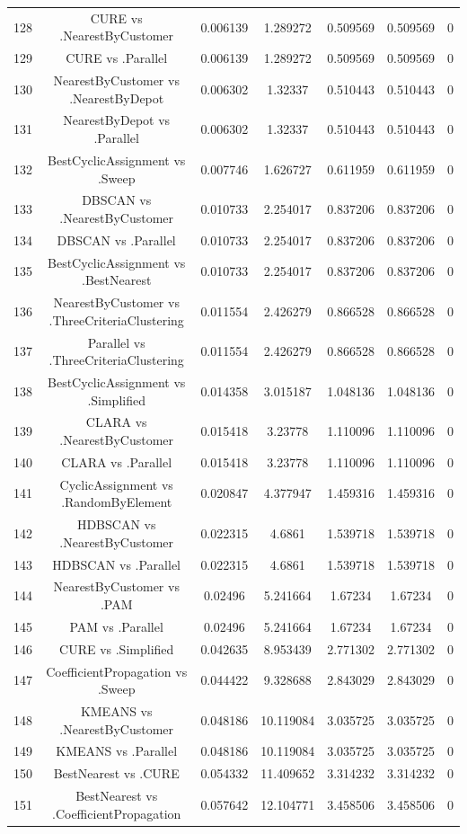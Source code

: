 \documentclass[a4paper,10pt]{article}
\begin{document}
\begin{landscape}
\begin{table}[!htp]
\begin{tabular}{ccccccc}
128&CURE vs .NearestByCustomer&0.006139&1.289272&0.509569&0.509569&0\\
129&CURE vs .Parallel&0.006139&1.289272&0.509569&0.509569&0\\
130&NearestByCustomer vs .NearestByDepot&0.006302&1.32337&0.510443&0.510443&0\\
131&NearestByDepot vs .Parallel&0.006302&1.32337&0.510443&0.510443&0\\
132&BestCyclicAssignment vs .Sweep&0.007746&1.626727&0.611959&0.611959&0\\
133&DBSCAN vs .NearestByCustomer&0.010733&2.254017&0.837206&0.837206&0\\
134&DBSCAN vs .Parallel&0.010733&2.254017&0.837206&0.837206&0\\
135&BestCyclicAssignment vs .BestNearest&0.010733&2.254017&0.837206&0.837206&0\\
136&NearestByCustomer vs .ThreeCriteriaClustering&0.011554&2.426279&0.866528&0.866528&0\\
137&Parallel vs .ThreeCriteriaClustering&0.011554&2.426279&0.866528&0.866528&0\\
138&BestCyclicAssignment vs .Simplified&0.014358&3.015187&1.048136&1.048136&0\\
139&CLARA vs .NearestByCustomer&0.015418&3.23778&1.110096&1.110096&0\\
140&CLARA vs .Parallel&0.015418&3.23778&1.110096&1.110096&0\\
141&CyclicAssignment vs .RandomByElement&0.020847&4.377947&1.459316&1.459316&0\\
142&HDBSCAN vs .NearestByCustomer&0.022315&4.6861&1.539718&1.539718&0\\
143&HDBSCAN vs .Parallel&0.022315&4.6861&1.539718&1.539718&0\\
144&NearestByCustomer vs .PAM&0.02496&5.241664&1.67234&1.67234&0\\
145&PAM vs .Parallel&0.02496&5.241664&1.67234&1.67234&0\\
146&CURE vs .Simplified&0.042635&8.953439&2.771302&2.771302&0\\
147&CoefficientPropagation vs .Sweep&0.044422&9.328688&2.843029&2.843029&0\\
148&KMEANS vs .NearestByCustomer&0.048186&10.119084&3.035725&3.035725&0\\
149&KMEANS vs .Parallel&0.048186&10.119084&3.035725&3.035725&0\\
150&BestNearest vs .CURE&0.054332&11.409652&3.314232&3.314232&0\\
151&BestNearest vs .CoefficientPropagation&0.057642&12.104771&3.458506&3.458506&0\\

\end{tabular}
\end{table}
\end{landscape}
\end{document}
